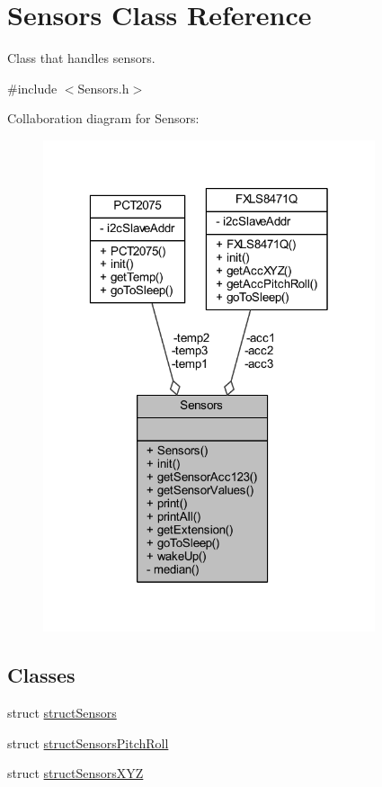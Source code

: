 \hypertarget{class_sensors}{}\section{Sensors Class Reference}
\label{class_sensors}


Class that handles sensors.  




{\ttfamily \#include $<$Sensors.\+h$>$}



Collaboration diagram for Sensors\+:\nopagebreak
\begin{figure}[H]
\begin{center}
\leavevmode
\includegraphics[width=277pt]{class_sensors__coll__graph}
\end{center}
\end{figure}
\subsection*{Classes}
\begin{DoxyCompactItemize}
\item 
struct \hyperlink{struct_sensors_1_1struct_sensors}{struct\+Sensors}
\item 
struct \hyperlink{struct_sensors_1_1struct_sensors_pitch_roll}{struct\+Sensors\+Pitch\+Roll}
\item 
struct \hyperlink{struct_sensors_1_1struct_sensors_x_y_z}{struct\+Sensors\+X\+YZ}
\end{DoxyCompactItemize}
